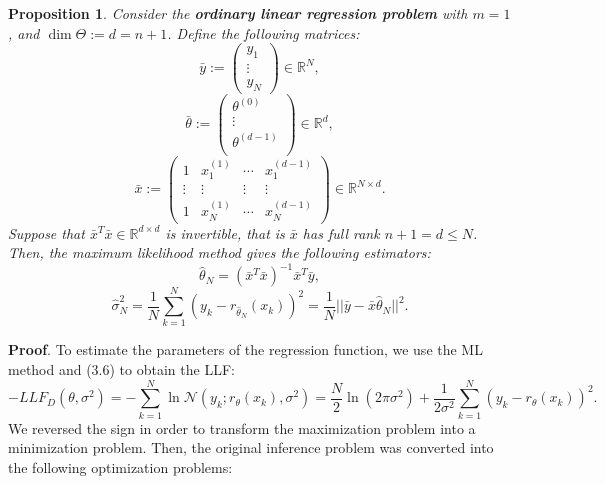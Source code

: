 \documentclass{report}
\newtheorem{proposition}{Proposition}[chapter]
\begin{document}
\begin{proposition}
Consider the \textbf{ordinary linear regression problem} with $m=1$, and $\dim \Theta := d = n + 1$. Define the following matrices:
\begin{equation}
\bar{y} := \begin{pmatrix}y_1\\
\vdots\\
y_N
\end{pmatrix} \in \mathbb{R}^N,
\end{equation}
\begin{equation}
\bar{\theta} := \begin{pmatrix}\theta^{(0)}\\
\vdots\\
\theta^{(d-1)}\\
\end{pmatrix} \in \mathbb{R}^{d},
\end{equation}
\begin{equation}
\bar{x} := \begin{pmatrix}
1 & x^{(1)}_1 & \cdots & x^{(d-1)}_1\\
\vdots & \vdots  & \vdots & \vdots \\
1 & x^{(1)}_N  &\cdots & x^{(d-1)}_N
\end{pmatrix} \in \mathbb{R}^{N \times d}.
\end{equation}
Suppose that $\bar{x}^T\bar{x} \in \mathbb{R}^{d \times d}$ is invertible, that is $\bar{x}$ has full rank $n + 1 = d \leq N$.
Then, the maximum likelihood method gives the following estimators:
\begin{equation}
\hat{\theta}_N = (\bar{x}^T\bar{x})^{-1}\bar{x}^T\bar{y},
\end{equation}
\begin{equation}
\hat{\sigma}_N^2 = \frac{1}{N}\sum_{k=1}^{N}(y_k-r_{\hat{\theta}_N}(x_k))^2 = \frac{1}{N}||\bar{y} -\bar{x}\hat{\theta}_N||^2.
\end{equation}
\end{proposition}
\textbf{Proof}. To estimate the parameters of the regression function, we use the ML method and (3.6) to obtain the LLF:
\begin{equation}
-LLF_{D}(\theta,\sigma^2)=-\sum_{k=1}^N\ln\mathcal{N}(y_k;r_\theta(x_k),\sigma^2)=\frac{N}{2}\ln(2\pi\sigma^2)+\frac{1}{2\sigma^2}\sum_{k=1}^N(y_k-r_\theta(x_k))^2.
\end{equation}
We reversed the sign in order to transform the maximization problem into a minimization problem. Then, the original inference problem was converted into the following optimization problems:
\end{document}
